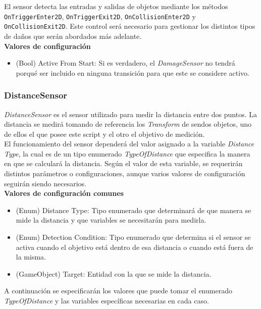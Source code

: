 El sensor detecta las entradas y salidas de objetos mediante los métodos \texttt{OnTriggerEnter2D}, \texttt{OnTriggerExit2D}, \texttt{OnCollisionEnter2D} y \texttt{OnCollisionExit2D}. Este control será necesario para gestionar los distintos tipos de daños que serán abordados más adelante.\\

\textbf{Valores de configuración}
\begin{itemize}
	\item (Bool) Active From Start: Si es verdadero, el \textit{DamageSensor} no tendrá porqué ser incluido en ninguna transición para que este se considere activo.
\end{itemize}

\subsubsection{DistanceSensor}

\textit{DistanceSensor} es el sensor utilizado para medir la distancia entre dos puntos. La distancia se medirá tomando de referencia los \textit{Transform} de sendos objetos, uno de ellos el que posee este script y el otro el objetivo de medición.\\

El funcionamiento del sensor dependerá del valor asignado a la variable \textit{Distance Type}, la cual es de un tipo enumerado \textit{TypeOfDistance} que especifica la manera en que se calculará la distancia. Según el valor de esta variable, se requerirán distintos parámetros o configuraciones, aunque varios valores de configuración seguirán siendo necesarios.\\

\textbf{Valores de configuración comunes}
\begin{itemize}
	\item (Enum) Distance Type: Tipo enumerado que determinará de que manera se mide la distancia y que variables se necesitarán para medirla.
	\item (Enum) Detection Condition: Tipo enumerado que determina si el sensor se activa cuando el objetivo está dentro de esa distancia o cuando está fuera de la misma.
	\item (GameObject) Target: Entidad con la que se mide la distancia.
\end{itemize}

A continuación se especificarán los valores que puede tomar el enumerado \textit{TypeOfDistance} y las variables específicas necesarias en cada caso.\\

